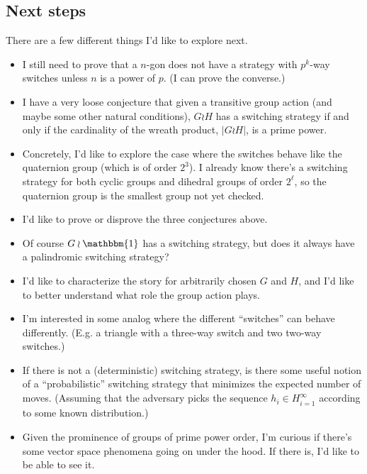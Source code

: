 \documentclass{article}
\numberwithin{equation}{subsection}
\begin{document}
\subsection{Next steps}
There are a few different things I'd like to explore next. \begin{itemize}
  \item I still need to prove that a $n$-gon does not have a strategy with
  $p^k$-way switches unless $n$ is a power of $p$. (I can prove the converse.)
  \item I have a very loose conjecture that given a transitive group action
  (and maybe some other natural conditions), $G \wr H$ has a switching strategy
  if and only if the cardinality of the wreath product, $|G \wr H|$, is a prime
  power.
  \item Concretely, I'd like to explore the case where the switches behave
  like the quaternion group (which is of order $2^3$). I already know there's a
  switching strategy for both cyclic groups and dihedral groups of order
  $2^\ell$, so the quaternion group is the smallest group not yet checked.
  \item I'd like to prove or disprove the three conjectures above.
  \item Of course $G \wr \mathbbm{1}$ has a switching strategy, but does it always have a palindromic switching strategy?
  \item I'd like to characterize the story for arbitrarily chosen $G$ and $H$,
  and I'd like to better understand what role the group action plays.
  \item I'm interested in some analog where the different ``switches'' can behave differently.
  (E.g. a triangle with a three-way switch and two two-way switches.)
  \item If there is not a (deterministic) switching strategy, is there some
  useful notion of a ``probabilistic'' switching strategy that minimizes the
  expected number of moves. (Assuming that the adversary picks the sequence
  ${h_i \in H}_{i=1}^{\infty}$ according to some known distribution.)
  \item Given the prominence of groups of prime power order, I'm curious if
  there's some vector space phenomena going on under the hood. If there is,
  I'd like to be able to see it.
\end{itemize}
\end{document}
